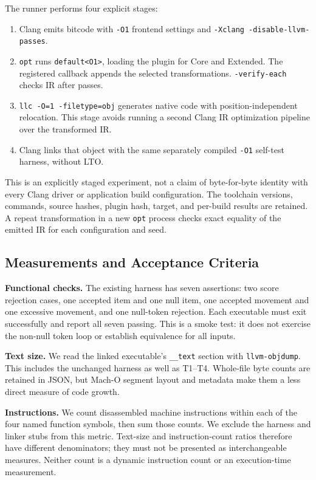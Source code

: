 \documentclass[conference]{IEEEtran}
\begin{document}
The runner performs four explicit stages:
\begin{enumerate}
  \item Clang emits bitcode with \texttt{-O1} frontend settings and
        \texttt{-Xclang -disable-llvm-passes}.
  \item \texttt{opt} runs \texttt{default<O1>}, loading the plugin for
        Core and Extended. The registered callback appends the selected
        transformations. \texttt{-verify-each} checks IR after passes.
  \item \texttt{llc -O=1 -filetype=obj} generates native code with
        position-independent relocation. This stage avoids running a
        second Clang IR optimization pipeline over the transformed IR.
  \item Clang links that object with the same separately compiled
        \texttt{-O1} self-test harness, without LTO.
\end{enumerate}

This is an explicitly staged experiment, not a claim of byte-for-byte
identity with every Clang driver or application build configuration.
The toolchain versions, commands, source hashes, plugin hash, target,
and per-build results are retained. A repeat transformation in a new
\texttt{opt} process checks exact equality of the emitted IR for each
configuration and seed.

\subsection{Measurements and Acceptance Criteria}

\textbf{Functional checks.} The existing harness has seven assertions:
two score rejection cases, one accepted item and one null item, one
accepted movement and one excessive movement, and one null-token
rejection. Each executable must exit successfully and report all seven
passing. This is a smoke test: it does not exercise the non-null token
loop or establish equivalence for all inputs.

\textbf{Text size.} We read the linked executable's \texttt{\_\_text}
section with \texttt{llvm-objdump}. This includes the unchanged harness
as well as T1--T4. Whole-file byte counts are retained in JSON, but
Mach-O segment layout and metadata make them a less direct measure of
code growth.

\textbf{Instructions.} We count disassembled machine instructions
within each of the four named function symbols, then sum those counts.
We exclude the harness and linker stubs from this metric. Text-size
and instruction-count ratios therefore have different denominators;
they must not be presented as interchangeable measures. Neither count
is a dynamic instruction count or an execution-time measurement.
\end{document}
